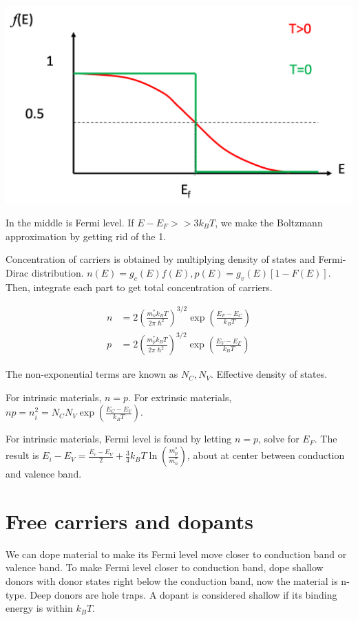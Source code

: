 \documentclass[a4paper,10pt]{article}
\begin{document}
\begin{multicols}{3}
\begin{center}
    \includegraphics[width=\columnwidth]{../img/Pasted image 20241010102613.png}
\end{center}

In the middle is Fermi level. If $E-E_{F} >> 3k_{B}T$, we make the Boltzmann approximation by getting rid of the 1.

Concentration of carriers is obtained by multiplying density of states and Fermi-Dirac distribution. $n(E) = g_c(E)f(E), p(E) = g_v(E)[1-F(E)]$. Then, integrate each part to get total concentration of carriers.

\begin{align*}
    n &= 2 \left( \frac{m_n^* k_B T}{2\pi \hslash^2} \right)^{3/2} \exp \left( \frac{E_F - E_C}{k_B T} \right)\\
    p &= 2 \left( \frac{m_p^* k_B T}{2\pi \hslash^2} \right)^{3/2} \exp \left( \frac{E_V - E_F}{k_B T} \right)
\end{align*}

The non-exponential terms are known as $N_C, N_V$. Effective density of states.

For intrinsic materials, $n=p$. For extrinsic materials, $np = n_{i}^{2} = N_{C}N_{V}\exp(\frac{E_{C}-E_{V}}{k_{B}T})$.

For intrinsic materials, Fermi level is found by letting $n=p$, solve for $E_{F}$. The result is $E_i - E_V = \frac{E_c - E_V}{2} + \frac{3}{4} k_B T \ln \left( \frac{m_p^*}{m_n^*} \right)$, about at center between conduction and valence band.

\section*{Free carriers and dopants}

We can dope material to make its Fermi level move closer to conduction band or valence band. To make Fermi level closer to conduction band, dope shallow donors with donor states right below the conduction band, now the material is n-type. Deep donors are hole traps. A dopant is considered shallow if its binding energy is within $k_B T$.


\end{multicols}
\end{document}
